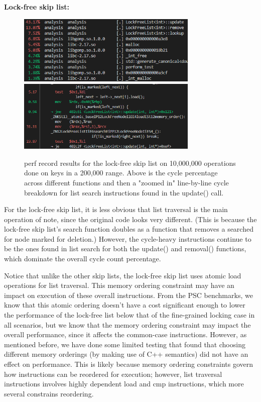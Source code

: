\documentclass[11pt]{article}
\begin{document}
\textbf{Lock-free skip list:} 
\begin{figure}[h!]
\includegraphics[width=3.4in]{ex1_s2_overall_cycles.png}
\includegraphics[width=3.4in]{ex1_s2_cycles.png} \\
\caption{perf record results for the lock-free skip list on 10,000,000 operations done on keys in a 200,000 range. Above is the cycle percentage across different functions and then a "zoomed in" line-by-line cycle breakdown for list search instructions found in the update() call.}
\end{figure}

For the lock-free skip list, it is less obvious that list traversal is the main operation of note, since the original code looks very different. (This is because the lock-free skip list's search function doubles as a function that removes a searched for node marked for deletion.) However, the cycle-heavy instructions continue to be the ones found in list search for both the update() and removal() functions, which dominate the overall cycle count percentage. 

Notice that unlike the other skip lists, the lock-free skip list uses atomic load operations for list traversal. This memory ordering constraint may have an impact on execution of these overall instructions. From the PSC benchmarks, we know that this atomic ordering doesn't have a cost significant enough to lower the performance of the lock-free list below that of the fine-grained locking case in all scenarios, but we know that the memory ordering constraint may impact the overall performance, since it affects the common-case instructions. However, as mentioned before, we have done some limited testing that found that choosing different memory orderings (by making use of C++ semantics) did not have an effect on performance. This is likely because memory ordering constraints govern how instructions can be reordered for execution; however, list traversal instructions involves highly dependent load and cmp instructions, which more several constrains reordering. 
\end{document}
